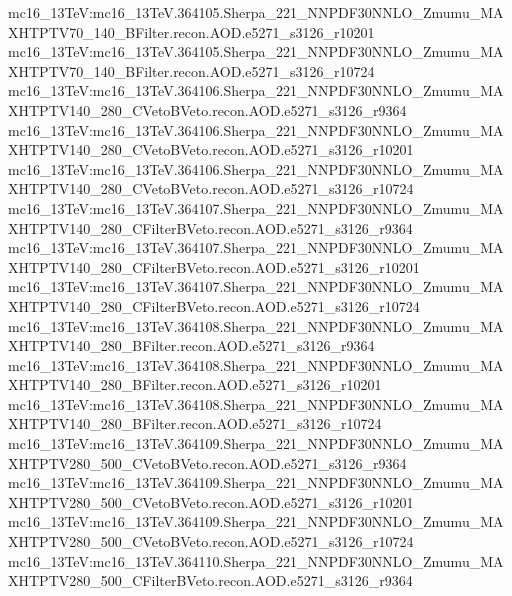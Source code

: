 { mc16\_13TeV:mc16\_13TeV.364105.Sherpa\_221\_NNPDF30NNLO\_Zmumu\_MAXHTPTV70\_140\_BFilter.recon.AOD.e5271\_s3126\_r10201 \newline    
 mc16\_13TeV:mc16\_13TeV.364105.Sherpa\_221\_NNPDF30NNLO\_Zmumu\_MAXHTPTV70\_140\_BFilter.recon.AOD.e5271\_s3126\_r10724  \newline   
 mc16\_13TeV:mc16\_13TeV.364106.Sherpa\_221\_NNPDF30NNLO\_Zmumu\_MAXHTPTV140\_280\_CVetoBVeto.recon.AOD.e5271\_s3126\_r9364 \newline    
 mc16\_13TeV:mc16\_13TeV.364106.Sherpa\_221\_NNPDF30NNLO\_Zmumu\_MAXHTPTV140\_280\_CVetoBVeto.recon.AOD.e5271\_s3126\_r10201 \newline    
 mc16\_13TeV:mc16\_13TeV.364106.Sherpa\_221\_NNPDF30NNLO\_Zmumu\_MAXHTPTV140\_280\_CVetoBVeto.recon.AOD.e5271\_s3126\_r10724 \newline    
 mc16\_13TeV:mc16\_13TeV.364107.Sherpa\_221\_NNPDF30NNLO\_Zmumu\_MAXHTPTV140\_280\_CFilterBVeto.recon.AOD.e5271\_s3126\_r9364 \newline    
 mc16\_13TeV:mc16\_13TeV.364107.Sherpa\_221\_NNPDF30NNLO\_Zmumu\_MAXHTPTV140\_280\_CFilterBVeto.recon.AOD.e5271\_s3126\_r10201 \newline    
 mc16\_13TeV:mc16\_13TeV.364107.Sherpa\_221\_NNPDF30NNLO\_Zmumu\_MAXHTPTV140\_280\_CFilterBVeto.recon.AOD.e5271\_s3126\_r10724 \newline    
 mc16\_13TeV:mc16\_13TeV.364108.Sherpa\_221\_NNPDF30NNLO\_Zmumu\_MAXHTPTV140\_280\_BFilter.recon.AOD.e5271\_s3126\_r9364 \newline    
 mc16\_13TeV:mc16\_13TeV.364108.Sherpa\_221\_NNPDF30NNLO\_Zmumu\_MAXHTPTV140\_280\_BFilter.recon.AOD.e5271\_s3126\_r10201 \newline    
 mc16\_13TeV:mc16\_13TeV.364108.Sherpa\_221\_NNPDF30NNLO\_Zmumu\_MAXHTPTV140\_280\_BFilter.recon.AOD.e5271\_s3126\_r10724 \newline    
 mc16\_13TeV:mc16\_13TeV.364109.Sherpa\_221\_NNPDF30NNLO\_Zmumu\_MAXHTPTV280\_500\_CVetoBVeto.recon.AOD.e5271\_s3126\_r9364 \newline    
 mc16\_13TeV:mc16\_13TeV.364109.Sherpa\_221\_NNPDF30NNLO\_Zmumu\_MAXHTPTV280\_500\_CVetoBVeto.recon.AOD.e5271\_s3126\_r10201 \newline    
 mc16\_13TeV:mc16\_13TeV.364109.Sherpa\_221\_NNPDF30NNLO\_Zmumu\_MAXHTPTV280\_500\_CVetoBVeto.recon.AOD.e5271\_s3126\_r10724 \newline    
 mc16\_13TeV:mc16\_13TeV.364110.Sherpa\_221\_NNPDF30NNLO\_Zmumu\_MAXHTPTV280\_500\_CFilterBVeto.recon.AOD.e5271\_s3126\_r9364  \newline   
}
